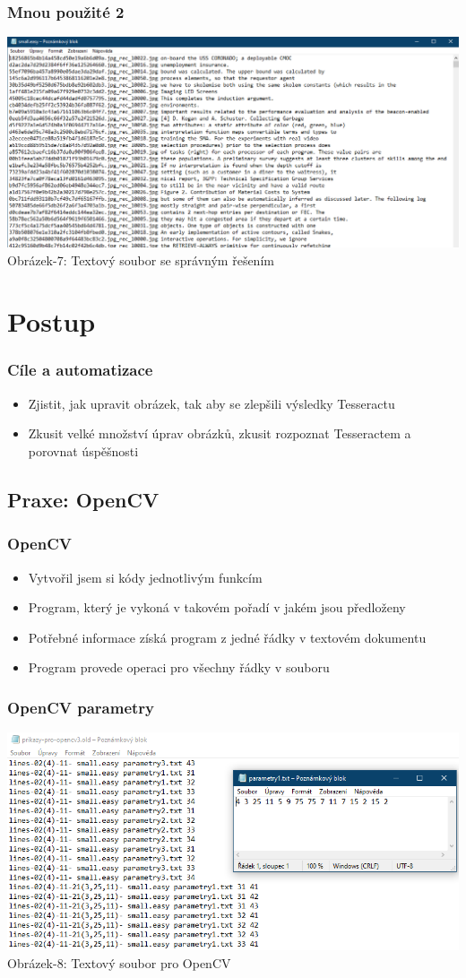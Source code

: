 \documentclass{beamer}
\begin{document}
\begin{frame}
\frametitle{Mnou použité 2}
		\includegraphics[width=1\textwidth]{img/b-mod-text.png}\\
     	Obrázek-7: Textový soubor se správným řešením
\end{frame}
\section{Postup}
\begin{frame}
\frametitle{Cíle a automatizace}
\begin{itemize}
\item Zjistit, jak upravit obrázek, tak aby se zlepšili výsledky Tesseractu
\item Zkusit velké množství úprav obrázků, zkusit rozpoznat Tesseractem a porovnat úspěšnosti
\end{itemize}
\end{frame}
\subsection{Praxe: OpenCV}
\begin{frame}
\frametitle{OpenCV}
\begin{itemize}
\item Vytvořil jsem si kódy jednotlivým funkcím
\item Program, který je vykoná v takovém pořadí v jakém jsou předloženy
\item Potřebné informace získá program z jedné řádky v textovém dokumentu
\item Program provede operaci pro všechny řádky v souboru
\end{itemize}
\end{frame}
\begin{frame}
\frametitle{OpenCV parametry}
\centering
		\includegraphics[width=1.1\textwidth]{img/pro-OpenCV.png}\\
     	Obrázek-8: Textový soubor pro OpenCV
\end{frame}
\end{document}
